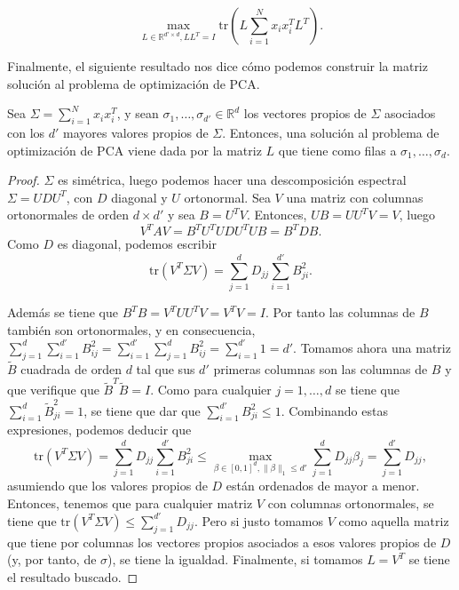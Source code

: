 \begin{equation}
    \max_{L \in \mathbb{R}^{d'\times d}, LL^T = I} \text{tr}\left(L\sum_{i=1}^Nx_ix_i^TL^T\right).
\end{equation}

Finalmente, el siguiente resultado nos dice cómo podemos construir la matriz solución al problema de optimización de PCA.

\begin{teorema}
    Sea $\Sigma = \sum_{i=1}^Nx_ix_i^T$, y sean $\sigma_1, \dots, \sigma_{d'} \in \mathbb{R}^d$ los vectores propios de $\Sigma$ asociados con los $d'$ mayores valores propios de $\Sigma$. Entonces, una solución al problema de optimización de PCA viene dada por la matriz $L$ que tiene como filas a $\sigma_1, \dots, \sigma_d$.
\end{teorema}

\begin{proof}
    $\Sigma$ es simétrica, luego podemos hacer una descomposición espectral $\Sigma = U DU^T$, con $D$ diagonal y $U$ ortonormal. Sea $V$ una matriz con columnas ortonormales de orden $d\times d'$ y sea $B = U^TV$. Entonces, $UB = UU^TV = V$, luego 
    \[V^TAV = B^TU^TUDU^TUB = B^TDB.\]
    Como $D$ es diagonal, podemos escribir
    \[\text{tr}(V^T\Sigma V) = \sum_{j=1}^d D_{jj}\sum_{i=1}^{d'}B_{ji}^2.\]

    Además se tiene que $B^TB = V^TUU^TV = V^TV = I$. Por tanto las columnas de $B$ también son ortonormales, y en consecuencia, $\sum_{j=1}^d\sum_{i=1}^{d'}B_{ij}^2 = \sum_{i=1}^{d'}\sum_{j=1}^d B_{ij}^2  = \sum_{i=1}^{d'} 1 = d'$. Tomamos ahora una matriz $\tilde{B}$ cuadrada de orden $d$ tal que sus $d'$ primeras columnas son las columnas de $B$ y que verifique que $\tilde{B}^T\tilde{B} = I$. Como para cualquier $j=1,\dots, d$ se tiene que $\sum_{i=1}^d \tilde{B}^2_{ji} = 1$, se tiene que dar que $\sum_{i=1}^{d'}B_{ji}^2 \le 1$. Combinando estas expresiones, podemos deducir que
    \[\text{tr}(V^T\Sigma V) = \sum_{j=1}^d D_{jj}\sum_{i=1}^{d'}B_{ji}^2 \le \max_{\beta \in [0,1]^d, \|\beta\|_1 \le d'} \sum_{j=1}^d D_{jj}\beta_j = \sum_{j=1}^{d'}D_{jj}, \]
    asumiendo que los valores propios de $D$ están ordenados de mayor a menor. Entonces, tenemos que para cualquier matriz $V$ con columnas ortonormales, se tiene que $\text{tr}(V^T\Sigma V) \le \sum_{j=1}^{d'}D_{jj}$. Pero si justo tomamos $V$ como aquella matriz que tiene por columnas los vectores propios asociados a esos valores propios de $D$ (y, por tanto, de $\sigma$), se tiene la igualdad. Finalmente, si tomamos $L = V^T$ se tiene el resultado buscado.
\end{proof}

